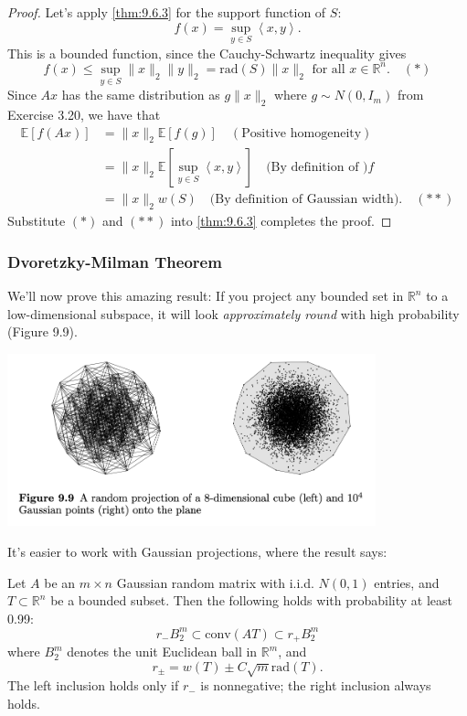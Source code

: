 \begin{proof}
Let's apply \cref{thm:9.6.3} for the support function of $S$:
\[ f(x) = \sup_{y \in S}\left\langle x, y \right\rangle. \]
This is a bounded function, since the Cauchy-Schwartz inequality gives 
\[ f(x) \leq \sup_{y \in S}\lVert x \rVert_{2}\lVert y \rVert_{2} = \mathrm{rad}(S) \lVert x \rVert_{2} 
\text{ for all } x \in \mathbb{R}^n. \quad (*) \]
Since $Ax$ has the same distribution as $g \lVert x \rVert_{2}$ where $g \sim N(0, I_m)$ from Exercise 3.20, 
we have that 
\begin{align*}
	\mathbb{E}\left[ f(Ax) \right] 
	&= \lVert x \rVert_{2} \mathbb{E}\left[ f(g) \right] \quad (\text{Positive homogeneity}) \\
	&= \lVert x \rVert_{2} \mathbb{E}\left[ \sup_{y \in S}\left\langle x, y \right\rangle \right] \quad 
	\text{(By definition of )} f \\
	&= \lVert x \rVert_{2} w(S) \quad \text{(By definition of Gaussian width)}. \quad (**)
\end{align*}
Substitute $(*)$ and $(**)$ into \cref{thm:9.6.3} completes the proof.
\end{proof}


\subsubsection{Dvoretzky-Milman Theorem}
We'll now prove this amazing result: If you project any bounded set in $\mathbb{R}^n$ to a low-dimensional 
subspace, it will look \textit{approximately round} with high probability (Figure 9.9).

\begin{center}
	\includegraphics[width=0.8\textwidth]{Chapter 9/fig9-9.png}
\end{center}

It's easier to work with Gaussian projections, where the result says:
\begin{theorem}
\label{thm:9.7.2}
Let $A$ be an $m \times n$ Gaussian random matrix with i.i.d. $N(0, 1)$ entries, and $T \subset \mathbb{R}^n$ be 
a bounded subset. Then the following holds with probability at least 0.99:
\[ r_- B_2^m \subset \mathrm{conv}(AT) \subset r_+ B_2^m \]
where $B_2^m$ denotes the unit Euclidean ball in $\mathbb{R}^m$, and 
\[ r_{\pm} = w(T) \pm C \sqrt{m} \mathrm{rad}(T). \]
The left inclusion holds only if $r_-$ is nonnegative; the right inclusion always holds.
\end{theorem}

